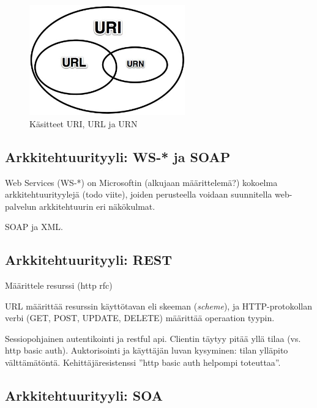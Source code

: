 \documentclass[finnish,gradu]{tktltiki}
\begin{document}
  \begin{figure}
    \centering
    \includegraphics[width=0.6\textwidth]{images/uri_url_urn.jpg}
    \caption{Käsitteet URI, URL ja URN}
    \label{fig:uri_url_urn}
  \end{figure}



  \subsection{Arkkitehtuurityyli: WS-* ja SOAP} %
  \label{sub:arkkitehtuurityyli_ws_}
    Web Services (WS-*) on Microsoftin (alkujaan määrittelemä?) kokoelma arkkitehtuurityylejä (todo viite), joiden perusteella voidaan suunnitella web-palvelun arkkitehtuurin eri näkökulmat.

    SOAP ja XML.


  \subsection{Arkkitehtuurityyli: REST} %
  \label{sub:arkkitehtuurityyli_rest}

  Määrittele resurssi (http rfc)

  URL määrittää resurssin käyttötavan eli skeeman (\emph{scheme}), ja HTTP-protokollan verbi (GET, POST, UPDATE, DELETE) määrittää operaation tyypin.

  Sessiopohjainen autentikointi ja restful api. Clientin täytyy pitää yllä tilaa (vs. http basic auth).
  Auktorisointi ja käyttäjän luvan kysyminen: tilan ylläpito välttämätöntä. Kehittäjäresistenssi ''http basic auth helpompi toteuttaa''.





  \subsection{Arkkitehtuurityyli: SOA} %
  \label{sub:arkkitehtuurityyli_soa}
\end{document}
